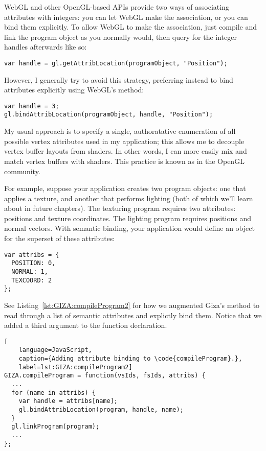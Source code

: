 WebGL and other OpenGL-based APIs provide two ways of associating attributes with integers: you can let WebGL make the association, or you can bind them explicitly.  To allow WebGL to make the association, just compile and link the program object as you normally would, then query for the integer handles afterwards like so:

\begin{lstlisting}
var handle = gl.getAttribLocation(programObject, "Position");
\end{lstlisting}

However, I generally try to avoid this strategy, preferring instead to bind attributes explicitly using WebGL's  method:

\begin{lstlisting}
var handle = 3;
gl.bindAttribLocation(programObject, handle, "Position");
\end{lstlisting}

My usual approach is to specify a single, authoratative enumeration of all possible vertex attributes used in my application; this allows me to decouple vertex buffer layouts from shaders.  In other words, I can more easily mix and match vertex buffers with shaders.  This practice is known as   in the OpenGL community.

For example, suppose your application creates two program objects: one that applies a texture, and another that performs lighting (both of which we'll learn about in future chapters).  The texturing program requires two attributes: positions and texture coordinates.  The lighting program requires positions and normal vectors.  With semantic binding, your application would define an object for the superset of these attributes:

\begin{lstlisting}
var attribs = {
  POSITION: 0,
  NORMAL: 1,
  TEXCOORD: 2
};
\end{lstlisting}

See Listing~\ref{lst:GIZA:compileProgram2} for how we augmented Giza's  method to read through a list of semantic attributes and explictly bind them.  Notice that we added a third argument to the function declaration.

\begin{lstlisting}[
    language=JavaScript,
    caption={Adding attribute binding to \code{compileProgram}.},
    label=lst:GIZA:compileProgram2]
GIZA.compileProgram = function(vsIds, fsIds, attribs) {
  ...
  for (name in attribs) {
    var handle = attribs[name];
    gl.bindAttribLocation(program, handle, name);
  }
  gl.linkProgram(program);
  ...
};
\end{lstlisting}

